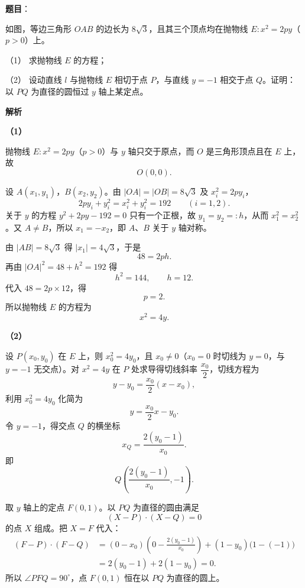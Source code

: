 \begin{answer}

\textbf{题目}：

如图，等边三角形 $OAB$ 的边长为 $8\sqrt3$，且其三个顶点均在抛物线 $E:x^2=2py$（$p>0$）上。

（1） 求抛物线 $E$ 的方程；

（2） 设动直线 $l$ 与抛物线 $E$ 相切于点 $P$，与直线 $y=-1$ 相交于点 $Q$。证明：以 $PQ$ 为直径的圆恒过 $y$ 轴上某定点。
\nopagebreak[4]
\begin{center}\end{center}
\nopagebreak[4]
\textbf{解析}

\textbf{（1）}

抛物线 $E:x^2=2py$（$p>0$）与 $y$ 轴只交于原点，而 $O$ 是三角形顶点且在 $E$ 上，故
\nopagebreak[4]
\[O(0,0).\]

设 $A(x_1,y_1)$，$B(x_2,y_2)$。由 $|OA|=|OB|=8\sqrt3$ 及 $x_i^2=2py_i$，
\nopagebreak[4]
\[2py_i+y_i^2=x_i^2+y_i^2=192\qquad(i=1,2).\]
关于 $y$ 的方程 $y^2+2py-192=0$ 只有一个正根，故 $y_1=y_2=:h$，从而 $x_1^2=x_2^2$。又 $A\neq B$，所以 $x_1=-x_2$，即 $A$、$B$ 关于 $y$ 轴对称。

由 $|AB|=8\sqrt3$ 得 $|x_1|=4\sqrt3$，于是
\nopagebreak[4]
\[48=2ph.\]
再由 $|OA|^2=48+h^2=192$ 得
\nopagebreak[4]
\[h^2=144,\qquad h=12.\]
代入 $48=2p\times12$，得
\nopagebreak[4]
\[p=2.\]
所以抛物线 $E$ 的方程为
\nopagebreak[4]
\[x^2=4y.\]

\textbf{（2）}

设 $P(x_0,y_0)$ 在 $E$ 上，则 $x_0^2=4y_0$，且 $x_0\neq0$（$x_0=0$ 时切线为 $y=0$，与 $y=-1$ 无交点）。对 $x^2=4y$ 在 $P$ 处求导得切线斜率 $\dfrac{x_0}{2}$，切线方程为
\nopagebreak[4]
\[y-y_0=\frac{x_0}{2}(x-x_0),\]
利用 $x_0^2=4y_0$ 化简为
\nopagebreak[4]
\[y=\frac{x_0}{2}x-y_0.\]
令 $y=-1$，得交点 $Q$ 的横坐标
\nopagebreak[4]
\[x_Q=\frac{2(y_0-1)}{x_0}.\]
即
\nopagebreak[4]
\[Q\left(\frac{2(y_0-1)}{x_0},-1\right).\]

取 $y$ 轴上的定点 $F(0,1)$。以 $PQ$ 为直径的圆由满足
\nopagebreak[4]
\[(X-P)\cdot(X-Q)=0\]
的点 $X$ 组成。把 $X=F$ 代入：
\nopagebreak[4]
\[\begin{aligned}
(F-P)\cdot(F-Q)
&=(0-x_0)\left(0-\frac{2(y_0-1)}{x_0}\right)+(1-y_0)\bigl(1-(-1)\bigr)\\
&=2(y_0-1)+2(1-y_0)=0.
\end{aligned}\]
所以 $\angle PFQ=90^\circ$，点 $F(0,1)$ 恒在以 $PQ$ 为直径的圆上。


\end{answer}
